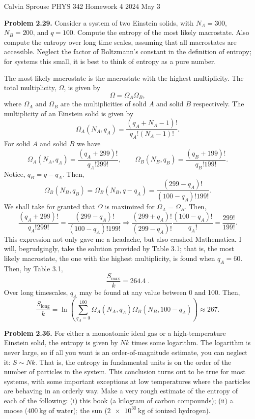 \documentclass[a4paper, 12pt]{config/homework}
\begin{document}
\noindent
Calvin Sprouse \hfill PHYS 342 Homework 4 \hfill 2024 May 3

\bigskip\noindent
\textbf{Problem 2.29.} Consider a system of two Einstein solids, with \(N_A=300\), \(N_B=200\), and \(q=100\). Compute the entropy of the most likely macrostate. Also compute the entropy over long time scales, assuming that all macrostates are accessible. Neglect the factor of Boltzmann's constant in the definition of entropy; for systems this small, it is best to think of entropy as a pure number.

\noindent
The most likely macrostate is the macrostate with the highest multiplicity. The total multiplicity, \(\Omega\), is given by
\[\Omega = \Omega_A \Omega_B,\]
where \(\Omega_A\) and \(\Omega_B\) are the multiplicities of solid \(A\) and solid \(B\) respectively. The multiplicity of an Einstein solid is given by
\[\Omega_A(N_A,q_A) = \frac{\left(q_A+N_A-1\right)!}{q_A!\left(N_A-1\right)!}.\]
For solid \(A\) and solid \(B\) we have
\[\Omega_A(N_A, q_A) = \frac{\left(q_A + 299\right)!}{q_A!299!}, \qquad
\Omega_B(N_B, q_B) = \frac{\left(q_B + 199\right)!}{q_B!199!}.\]
Notice, \(q_B = q - q_A\). Then,
\[\Omega_B(N_B, q_B) = \Omega_B(N_B, q-q_A) = \frac{\left(299 - q_A\right)!}{(100-q_A)!199!}.\]
We shall take for granted that \(\Omega\) is maximized for \(\Omega_A = \Omega_B\). Then,
\[\frac{\left(q_A + 299\right)!}{q_A!299!} = \frac{\left(299 - q_A\right)!}{(100-q_A)!199!}
\Rightarrow
\frac{\left(299 + q_A\right)!}{\left(299 - q_A\right)!} \frac{\left(100 - q_A\right)!}{q_A!}
= \frac{299!}{199!}.\]
This expression not only gave me a headache, but also crashed Mathematica. I will, begrudgingly, take the solution provided by Table 3.1; that is, the most likely macrostate, the one with the highest multiplicity, is found when \(q_A=60\). Then, by Table 3.1,
\[\frac{S_{\text{max}}}{k} = \qty{264.4}{}.\]
Over long timescales, \(q_A\) may be found at any value between 0 and 100. Then,
\[\frac{S_{\text{long}}}{k} = \ln\left(\sum_{q_A=0}^{100}\Omega_A(N_A,q_A)\Omega_B(N_B,100-q_A)\right) \approx 267.\]

\pagebreak
\noindent
\textbf{Problem 2.36.} For either a monoatomic ideal gas or a high-temperature Einstein solid, the entropy is given by \(Nk\) times some logarithm. The logarithm is never large, so if all you want is an order-of-magnitude estimate, you can neglect it: \(S \sim Nk\). That is, the entropy in fundamental units is on the order of the number of particles in the system. This conclusion turns out to be true for most systems, with some important exceptions at low temperatures where the particles are behaving in an orderly way. Make a very rough estimate of the entropy of each of the following: (i) this book (a kilogram of carbon compounds); (ii) a moose (\(\qty{400}{\kg}\) of water); the sun (\(\qty{2e30}{\kg}\) of ionized hydrogen).
\end{document}
